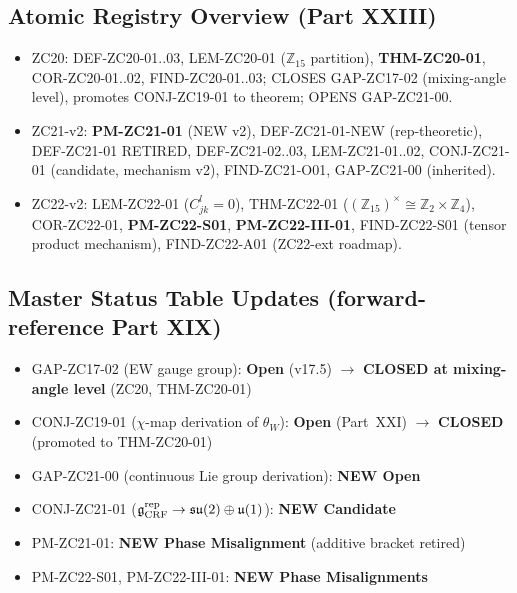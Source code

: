 \documentclass[12pt, a4paper]{article}
\begin{document}
\subsection*{Atomic Registry Overview (Part XXIII)}

\begin{itemize}[leftmargin=*, noitemsep]
\item ZC20: DEF-ZC20-01..03, LEM-ZC20-01 ($\mathbb{Z}_{15}$ partition),
  \textbf{THM-ZC20-01}, COR-ZC20-01..02, FIND-ZC20-01..03;
  CLOSES GAP-ZC17-02 (mixing-angle level), promotes CONJ-ZC19-01 to theorem;
  OPENS GAP-ZC21-00.
\item ZC21-v2: \textbf{PM-ZC21-01} (NEW v2), DEF-ZC21-01-NEW
  (rep-theoretic), DEF-ZC21-01 RETIRED, DEF-ZC21-02..03,
  LEM-ZC21-01..02, CONJ-ZC21-01 (candidate, mechanism v2),
  FIND-ZC21-O01, GAP-ZC21-00 (inherited).
\item ZC22-v2: LEM-ZC22-01 ($C_{jk}^l = 0$), THM-ZC22-01
  ($(\mathbb{Z}_{15})^\times \cong \mathbb{Z}_2 \times \mathbb{Z}_4$),
  COR-ZC22-01, \textbf{PM-ZC22-S01}, \textbf{PM-ZC22-III-01},
  FIND-ZC22-S01 (tensor product mechanism), FIND-ZC22-A01 (ZC22-ext roadmap).
\end{itemize}

\subsection*{Master Status Table Updates (forward-reference Part XIX)}

\begin{itemize}[leftmargin=*, noitemsep]
\item GAP-ZC17-02 (EW gauge group): \textbf{Open} (v17.5) $\to$
  \textbf{CLOSED at mixing-angle level} (ZC20, THM-ZC20-01)
\item CONJ-ZC19-01 ($\chi$-map derivation of $\theta_W$):
  \textbf{Open} (Part~XXI) $\to$ \textbf{CLOSED} (promoted to THM-ZC20-01)
\item GAP-ZC21-00 (continuous Lie group derivation): \textbf{NEW Open}
\item CONJ-ZC21-01 ($\mathfrak{g}_{\rm CRF}^{\rm rep} \to
  \mathfrak{su}(2) \oplus \mathfrak{u}(1)$): \textbf{NEW Candidate}
\item PM-ZC21-01: \textbf{NEW Phase Misalignment} (additive bracket retired)
\item PM-ZC22-S01, PM-ZC22-III-01: \textbf{NEW Phase Misalignments}
\end{itemize}

\end{document}
